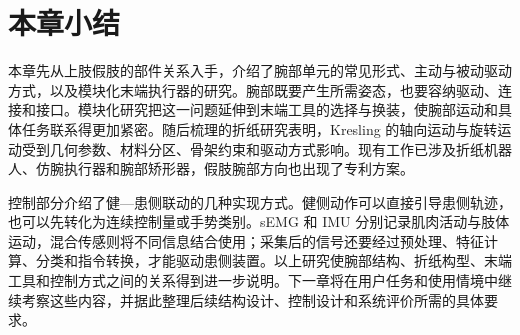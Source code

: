 \section{本章小结}

本章先从上肢假肢的部件关系入手，介绍了腕部单元的常见形式、主动与被动驱动方式，以及模块化末端执行器的研究。腕部既要产生所需姿态，也要容纳驱动、连接和接口。模块化研究把这一问题延伸到末端工具的选择与换装，使腕部运动和具体任务联系得更加紧密。随后梳理的折纸研究表明，Kresling 的轴向运动与旋转运动受到几何参数、材料分区、骨架约束和驱动方式影响。现有工作已涉及折纸机器人、仿腕执行器和腕部矫形器，假肢腕部方向也出现了专利方案。

控制部分介绍了健—患侧联动的几种实现方式。健侧动作可以直接引导患侧轨迹，也可以先转化为连续控制量或手势类别。sEMG 和 IMU 分别记录肌肉活动与肢体运动，混合传感则将不同信息结合使用；采集后的信号还要经过预处理、特征计算、分类和指令转换，才能驱动患侧装置。以上研究使腕部结构、折纸构型、末端工具和控制方式之间的关系得到进一步说明。下一章将在用户任务和使用情境中继续考察这些内容，并据此整理后续结构设计、控制设计和系统评价所需的具体要求。
